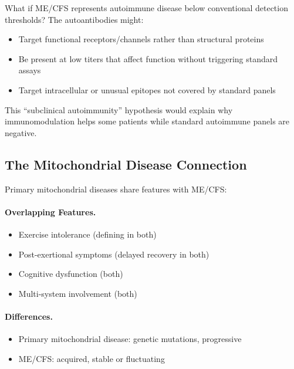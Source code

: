 \begin{open_question}
What if ME/CFS represents autoimmune disease below conventional detection thresholds? The autoantibodies might:
\begin{itemize}
    \item Target functional receptors/channels rather than structural proteins
    \item Be present at low titers that affect function without triggering standard assays
    \item Target intracellular or unusual epitopes not covered by standard panels
\end{itemize}
This ``subclinical autoimmunity'' hypothesis would explain why immunomodulation helps some patients while standard autoimmune panels are negative.
\end{open_question}

\subsection{The Mitochondrial Disease Connection}

Primary mitochondrial diseases share features with ME/CFS:

\paragraph{Overlapping Features.}
\begin{itemize}
    \item Exercise intolerance (defining in both)
    \item Post-exertional symptoms (delayed recovery in both)
    \item Cognitive dysfunction (both)
    \item Multi-system involvement (both)
\end{itemize}

\paragraph{Differences.}
\begin{itemize}
    \item Primary mitochondrial disease: genetic mutations, progressive
    \item ME/CFS: acquired, stable or fluctuating
\end{itemize}

